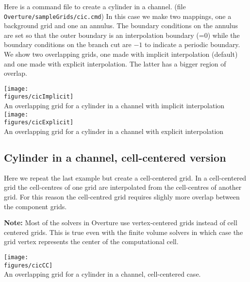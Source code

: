 \documentclass[xcolor=rgb,svgnames,dvipsnames]{article}
\newcommand{\figures}{\homeHenshaw/OvertureFigures}
\newcommand{\ogen}{\OvertureDir/ogen}
\begin{document}
Here is a command file to create a cylinder in a channel.
(file {\tt Overture/sampleGrids/cic.cmd})
In this case we make two mappings, one a background grid and one an
annulus. The boundary conditions on the annulus are set so that
the outer boundary is an interpolation boundary (=0) while the
boundary conditions on the branch cut are $-1$ to indicate a periodic
boundary. We show two overlapping grids, one made with implicit interpolation (default)
and one made with explicit interpolation. The latter has a bigger region of overlap.

\begin{minipage}{.4\linewidth}
{\footnotesize
\listinginput[1]{1}{\ogen /cic.cmd}
}
\end{minipage}\hfill
\begin{minipage}{.6\linewidth}
  \begin{center}
   \texttt{[image: \\figures/cicImplicit]}\\
  {An overlapping grid for a cylinder in a channel with implicit interpolation}  
   \texttt{[image: \\figures/cicExplicit]}\\
  {An overlapping grid for a cylinder in a channel with explicit interpolation}  \label{fig:cic}
  \end{center}
\end{minipage}

\clearpage
\subsection{Cylinder in a channel, cell-centered version }\label{sec:cylinderInAChannelCC}

Here we repeat the last example but create a cell-centered grid. 
In a cell-centered grid the cell-centres of one grid are interpolated
from the cell-centres of another grid. For this reason the cell-centred grid requires
slighly more overlap between the component grids.

{\bf Note:} Most of the solvers in Overture use vertex-centered grids instead of cell centered grids.
This is true even with the finite volume solvers in which case the grid vertex represents the center
of the computational cell. 

\begin{minipage}{.4\linewidth}
{\footnotesize
\listinginput[1]{1}{\ogen /cicCC.cmd}
}
\end{minipage}\hfill
\begin{minipage}{.6\linewidth}
  \begin{center}
   \texttt{[image: \\figures/cicCC]}\\
  {An overlapping grid for a cylinder in a channel, cell-centered case.}  \label{fig:cicCC}
  \end{center}
\end{minipage}
\end{document}
